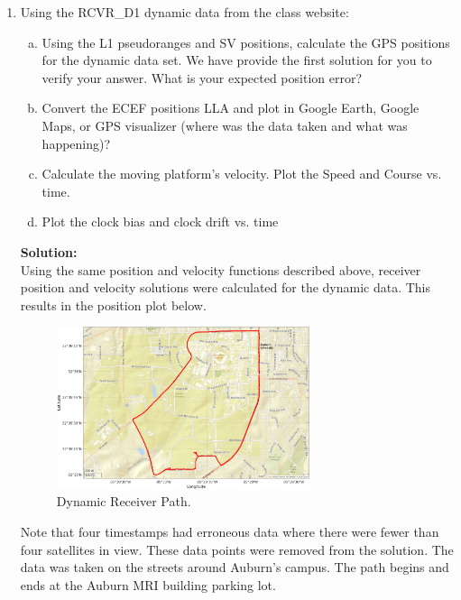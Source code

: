 \documentclass[11pt]{article}
\newcommand{\solution}{\textbf{Solution: \\}}
\begin{document}
\begin{enumerate}[label=\textbf{\arabic*.}]
  \item Using the RCVR\_D1 dynamic data from the class website:
  \begin{enumerate}[(a)]
    \itemsep -2pt
    \item Using the L1 pseudoranges and SV positions, calculate the GPS positions for the
    dynamic data set. We have provide the first solution for you to verify your answer. What
    is your expected position error?
    \item Convert the ECEF positions LLA and plot in Google Earth, Google Maps, or GPS
    visualizer (where was the data taken and what was happening)?
    \item Calculate the moving platform’s velocity. Plot the Speed and Course vs. time.
    \item Plot the clock bias and clock drift vs. time
  \end{enumerate}
  \solution
  Using the same position and velocity functions described above, receiver 
  position and velocity solutions were calculated for the dynamic data. This 
  results in the position plot below.
   \begin{figure}[H]
    \centering
    \includegraphics[width=0.7\textwidth]{dynamic_pos.png}
    \caption{Dynamic Receiver Path.}
  \end{figure}
  Note that four timestamps had erroneous data where there were fewer than four 
  satellites in view. These data points were removed from the solution. 
  The data was taken on the streets around Auburn's campus. The path begins 
  and ends at the Auburn MRI building parking lot.\\


\end{enumerate}
\end{document}

